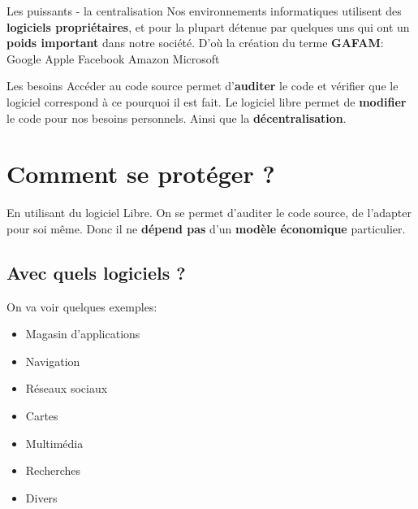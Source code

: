 \documentclass[aspectratio=169]{beamer}
\begin{document}
\begin{frame}{Les puissants - la centralisation}
Nos environnements informatiques utilisent des \textbf{logiciels propriétaires},\newline
et pour la plupart détenue par quelques uns qui ont un \textbf{poids important} dans notre société. \newline
\newline
D'où la création du terme \textbf{GAFAM}: Google Apple Facebook Amazon Microsoft
\end{frame}

\begin{frame}{Les besoins}
Accéder au code source permet d'\textbf{auditer} le code et vérifier que le logiciel correspond à ce pourquoi il est fait. \newline
\newline
Le logiciel libre permet de \textbf{modifier} le code pour nos besoins personnels.\newline
\newline
Ainsi que la \textbf{décentralisation}.
\end{frame}



\section{Comment se protéger ?}

\begin{frame}
\begin{center}
\huge{\color{cvp}{Comment se protéger ?}}
\end{center}
\end{frame}

\begin{frame}
En utilisant du logiciel Libre.\newline
On se permet d'auditer le code source,\newline
de l'adapter pour soi même.\newline
Donc il ne \textbf{dépend pas} d'un \textbf{modèle économique} particulier.
\end{frame}

\subsection{Avec quels logiciels ?}

\begin{frame}
On va voir quelques exemples:\newline
\begin{itemize}
	\item Magasin d'applications
	\item Navigation
	\item Réseaux sociaux
	\item Cartes
	\item Multimédia
	\item Recherches
	\item Divers
\end{itemize}
\end{frame}
\end{document}
